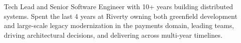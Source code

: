 

\begin{cvparagraph}

Tech Lead and Senior Software Engineer with 10+ years building distributed systems.
Spent the last 4 years at Riverty owning both greenfield development and large-scale legacy modernization in the payments domain, leading teams, driving architectural decisions, and delivering across multi-year timelines.

\end{cvparagraph}
